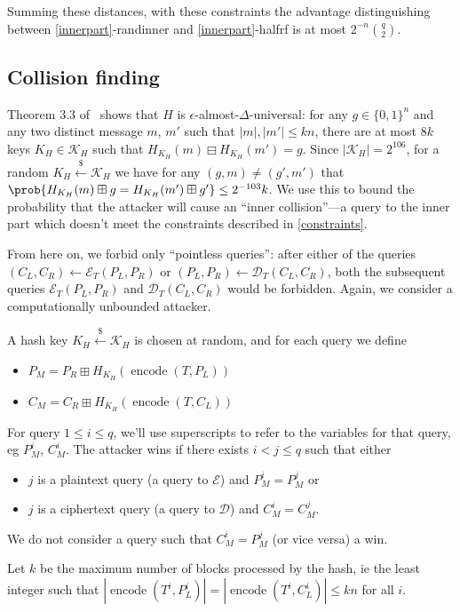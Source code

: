 \documentclass[letterpaper,luatex,11pt]{article}
\DeclareMathOperator{\encode}{encode}
\newcommand*{\xprm}[2]{\textsf{\ref*{#1}-#2}}
\newcommand*{\calE}{\mathcal{E}}
\newcommand*{\calD}{\mathcal{D}}
\begin{document}
Summing these distances, with these constraints the advantage distinguishing between
\xprm{innerpart}{randinner} and \xprm{innerpart}{halfrf} is at most
$2^{-n}\binom{q}{2}$.

\subsection{Collision finding}\label{collision}
Theorem 3.3 of~\cite{poly1305} shows that $H$ is $\epsilon$-almost-$\Delta$-universal:
for any $g \in \{0,1\}^n$ and
any two distinct message $m$, $m'$
such that $|m|, |m'| \leq kn$, there are at most
$8k$ keys $K_H \in \mathcal{K}_H$
such that $H_{K_H}(m) \boxminus H_{K_H}(m') = g$.
Since  $|\mathcal{K}_H| = 2^{106}$, for a random
$K_H \xleftarrow{\$} \mathcal{K}_H$ we have for any $(g, m) \neq (g', m')$ that
$\prob{H_{K_H}(m) \boxplus g = H_{K_H}(m') \boxplus g'} \leq 2^{-103}k$.
We use this to bound the probability that the attacker will cause an
``inner collision''---a query to the inner part which doesn't meet the constraints described
in \autoref{constraints}.

From here on, we forbid only ``pointless queries'': after either of the queries
$(C_L, C_R) \leftarrow \calE_T(P_L, P_R)$ or $(P_L, P_R) \leftarrow \calD_T(C_L, C_R)$,
both the subsequent queries
$\calE_T(P_L, P_R)$ and $\calD_T(C_L, C_R)$ would be forbidden. Again, we consider a
computationally unbounded attacker.

A hash key $K_H \xleftarrow{\$} \mathcal{K}_H$ is chosen at random, and for each query we define
\begin{itemize}
    \item $P_M = P_R \boxplus H_{K_H}(\encode(T, P_L))$
    \item $C_M = C_R \boxplus H_{K_H}(\encode(T, C_L))$
\end{itemize}

For query $1 \leq i \leq q$, we'll use superscripts to refer to the variables for that query, eg
$P_M^i$, $C_M^i$. The attacker wins if there exists $i < j \leq q$ such that
either
\begin{itemize}
    \item $j$ is a plaintext query (a query to $\calE$) and $P_M^i = P_M^j$ or
    \item $j$ is a ciphertext query (a query to $\calD$) and $C_M^i = C_M^j$.
\end{itemize}
We do not consider a query such that $C_M^i = P_M^j$ (or vice versa) a win.

Let $k$ be
the maximum number of blocks processed by the
hash, ie the least integer such that
$|\encode(T^i, P_L^i)| = |\encode(T^i, C_L^i)| \leq kn$ for all $i$.
\end{document}
